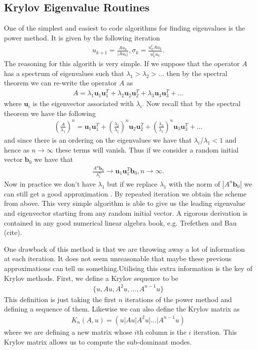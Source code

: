 \subsection{Krylov Eigenvalue Routines}
One of the simplest and easiest to code algorithms for finding eigenvalues is the power method. It is given by the following iteration \cite{MeyerLinAlg}
\begin{align}
u_{k+1}=\frac{Au_{k}}{|Au_{k}|}, \sigma_{k}=\frac{u_{k}^{t}Au_{k}}{u_{k}^{t}u_{k}}.
\end{align}
The reasoning for this algorith is very simple. If we suppose that the operator $A$ has a spectrum of eigenvalues such that $\lambda_{1} > \lambda_{2} > \ldots $ then by the spectral theorem we can re-write the operator $A$ as
\begin{align}
A = \lambda_{1}\bm{u}_{1}\bm{u}_{1}^{T} + \lambda_{2}\bm{u}_{2}\bm{u}_{2}^{T} + \lambda_{3}\bm{u}_{3}\bm{u}_{3}^{T} + \ldots 
\end{align} 
where $\bm{u}_{i}$ is the eigenvector associated with $\lambda_{i}$. Now recall that by the spectral theorem we have the following \cite{MeyerLinAlg}
\begin{align}
\left(\frac{A}{\lambda_{1}}\right)^{n} = \bm{u}_{1}\bm{u}_{1}^{T} + \left(\frac{\lambda_{2}}{\lambda_{1}}\right)^{n}\bm{u}_{2}\bm{u}_{2}^{T} + \left(\frac{\lambda_{3}}{\lambda_{1}}\right)^{n}\bm{u}_{3}\bm{u}_{3}^{T} + \ldots 
\end{align}
and since there is an ordering on the eigenvalues we have that $\lambda_{i}/\lambda_{1}<1$ and hence as $n\rightarrow\infty$ these terms will vanish. Thus if we consider a random initial vector $\bm{b}_{0}$ we have that 
\begin{align}
\frac{A^{n}\bm{b}_{0}}{\lambda_{1}^{n}}\rightarrow \bm{u}_{1}\bm{u}_{1}^{T}\bm{b}_{0}, n\rightarrow\infty.
\end{align}
Now in practice we don't have $\lambda_{1}$ but if we replace $\lambda_{1}$ with the norm of $|A^{n}\bm{b}_{0}|$ we can still get a good approximation \cite{MeyerLinAlg}. By repeated iteration we obtain the scheme from above. This very simple algorithm is able to give us the leading eigenvalue and eigenvector starting from any random initial vector. A rigorous derivation is contained in any good numerical linear algebra book, e.g. Trefethen and Bau (cite). 

One drawback of this method is that we are throwing away a lot of information at each iteration. It does not seem unreasonable that maybe these previous approximations can tell us something.Utilising this extra information is the key of Krylov methods. First, we define a Krylov sequence to be 
\begin{align}
\{u,Au,A^{2}u,\ldots,A^{n-1}u\}
\end{align}
This definition is just taking the first $n$ iterations of the power method and defining a sequence of them. Likewise we can also define the Krylov matrix as 
\begin{align}
K_{n}(A,u)=(u|Au|A^{2}u|\ldots|A^{n-1}u)
\end{align}
where we are defining a new matrix whose $i$th column is the $i$ iteration. This Krylov matrix allows us to compute the sub-dominant modes.  

